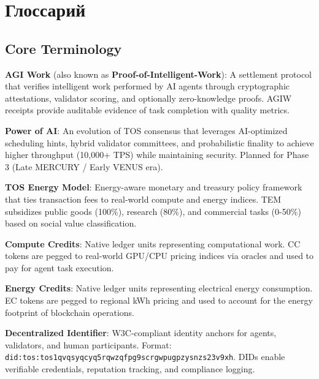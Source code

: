 \documentclass[11pt]{article}
\begin{document}
\clearpage

\section*{Глоссарий}

\subsection*{Core Terminology}

\begin{description}[leftmargin=3cm, style=nextline]
  \item[AGIW (PoIW)] \textbf{AGI Work} (also known as \textbf{Proof-of-Intelligent-Work}): A settlement protocol that verifies intelligent work performed by AI agents through cryptographic attestations, validator scoring, and optionally zero-knowledge proofs. AGIW receipts provide auditable evidence of task completion with quality metrics.

  \item[PAI] \textbf{Power of AI}: An evolution of TOS consensus that leverages AI-optimized scheduling hints, hybrid validator committees, and probabilistic finality to achieve higher throughput (10,000+ TPS) while maintaining security. Planned for Phase 3 (Late MERCURY / Early VENUS era).

  \item[TEM] \textbf{TOS Energy Model}: Energy-aware monetary and treasury policy framework that ties transaction fees to real-world compute and energy indices. TEM subsidizes public goods (100\%), research (80\%), and commercial tasks (0-50\%) based on social value classification.

  \item[CC] \textbf{Compute Credits}: Native ledger units representing computational work. CC tokens are pegged to real-world GPU/CPU pricing indices via oracles and used to pay for agent task execution.

  \item[EC] \textbf{Energy Credits}: Native ledger units representing electrical energy consumption. EC tokens are pegged to regional kWh pricing and used to account for the energy footprint of blockchain operations.

  \item[DID] \textbf{Decentralized Identifier}: W3C-compliant identity anchors for agents, validators, and human participants. Format: \texttt{did:tos:tos1qvqsyqcyq5rqwzqfpg9scrgwpugpzysnzs23v9xh}. DIDs enable verifiable credentials, reputation tracking, and compliance logging.


\end{description}
\end{document}

